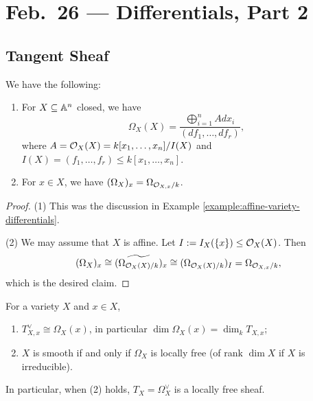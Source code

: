 \chapter{Feb.~26 --- Differentials, Part 2}

\section{Tangent Sheaf}

\begin{prop}\label{prop:differentials-affine-variety}
  We have the following:
  \begin{enumerate}
    \item For $X \subseteq \mathbb{A}^n$
      closed, we have
      \[\Omega_X(X) = \frac{\bigoplus_{i = 1}^n A dx_i}{(df_1, \dots, df_r)},\]
      where $A = \mathcal{O}_X(X) = k[x_1, \dots, x_n] / I(X)$
      and $I(X) = (f_1, \dots, f_r) \le k[x_1, \dots, x_n]$. 
    \item For $x \in X$,
      we have $(\Omega_X)_x = \Omega_{\mathcal{O}_{X, x} / k}$.
  \end{enumerate}
\end{prop}

\begin{proof}
  (1) This was the discussion in
  Example \ref{example:affine-variety-differentials}.

  (2) We may assume that $X$ is affine.
  Let $I := I_X(\{x\}) \le \mathcal{O}_X(X)$.
  Then
  \[
    (\Omega_X)_x
    \cong (\widetilde{\Omega_{\mathcal{O}_X(X) / k}})_x
    \cong (\Omega_{\mathcal{O}_X(X) / k})_I
    = \Omega_{\mathcal{O}_{X, x} / k},
  \]
  which is the desired claim.
\end{proof}

\begin{prop}
  For a variety $X$ and $x \in X$,
  \begin{enumerate}
    \item
      $T_{X, x}^\vee \cong \Omega_X(x)$,
      in particular
      $\dim \Omega_X(x) = \dim_k T_{X, x}$;
    \item $X$ is smooth if and only if
      $\Omega_X$ is locally free (of
      rank $\dim X$ if $X$ is irreducible).
  \end{enumerate}
  In particular, when
  (2) holds, $T_X = \Omega_X^\vee$ is a
  locally free sheaf.
\end{prop}

